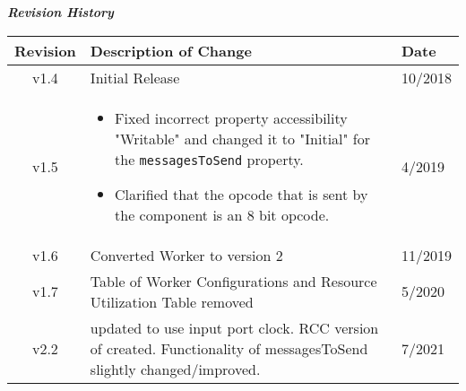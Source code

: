 \begin{center}
\textit{\textbf{Revision History}}
	\begin{table}[H]
	\label{table:revisions} %
		\begin{tabularx}{\textwidth}{|c|X|l|}
			\hline
			\rowcolor{blue}
			\textbf{Revision} & \textbf{Description of Change} & \textbf{Date} \\
		    \hline
		    v1.4 & Initial Release & 10/2018 \\
		    \hline
			v1.5 & \begin{itemize} \item Fixed incorrect property accessibility "Writable" and changed it to "Initial" for the \texttt{messagesToSend} property. \item Clarified that the opcode that is sent by the component is an 8 bit opcode. \end{itemize} & 4/2019 \\
			\hline
			v1.6 & Converted Worker to version 2 & 11/2019 \\
			\hline
			v1.7 & Table of Worker Configurations and Resource Utilization Table removed & 5/2020 \\
			\hline
			v2.2 & {\Comp} updated to use input port clock. RCC version of \comp created. Functionality of messagesToSend slightly changed/improved.  & 7/2021 \\
	                \hline
		\end{tabularx}
	\end{table}
\end{center}
\newpage

\def\name{\comp}
\def\workertype{}
\def\version{\ocpiversion}
\def\releasedate{05/2020}
\def\componentlibrary{ocpi.assets.util\_{}comps}
\def\workers{\comp{}.hdl}
\def\testedplatforms{isim, Matchstiq-Z1(PL), xsim, ZedBoard(PL), centos 7}

	
